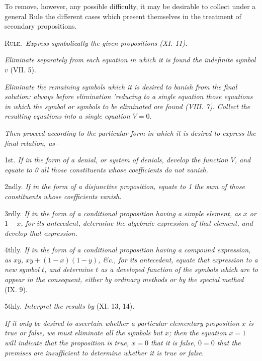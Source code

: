 \documentclass[oneside]{book}
\begin{document}
To remove, however, any possible difficulty, it may be desirable
to collect under a general Rule the different cases which
present themselves in the treatment of secondary propositions.

\textsc{Rule}.--\textit{Express symbolically the given propositions (XI. 11).}

\textit{Eliminate separately from each equation in which it is found the
indefinite symbol} $v$ (VII. 5).

\textit{Eliminate the remaining symbols which it is desired to banish
from the final solution: always before elimination 'reducing to a
single equation those equations in which the symbol or symbols to
be eliminated are found (VIII. 7). Collect the resulting equations
into a single equation $V = 0$}.

\textit{Then proceed according to the particular form in which it is
desired to express the final relation, as--}

1st. \textit{If in the form of a denial, or system of denials, develop the
function $V$, and equate to 0 all those constituents whose coefficients
do not vanish.}

2ndly. \textit{If in the form of a disjunctive proposition, equate to 1
the sum of those constituents whose coefficients vanish.}

3rdly. \textit{If in the form of a conditional proposition having a simple
element, as $x$ or $1-x$, for its antecedent, determine the algebraic
expression of that element, and develop that expression.}

4thly. \textit{If in the form of a conditional proposition having a
compound expression, as $xy$, $xy+(1-x)(1-y)$, \&c., for its antecedent,
equate that expression to a new symbol $t$, and determine $t$
as a developed function of the symbols which are to appear in the
consequent, either by ordinary methods or by the special method}
(IX. 9).

5thly. \textit{Interpret the results by} (XI. 13, 14).

\textit{If it only be desired to ascertain whether a particular elementary
proposition $x$ is true or false, we must eliminate all the symbols
but $x$; then the equation $x = 1$ will indicate that the proposition
is true, $x = 0$ that it is false, $0 = 0$ that the premises are insufficient
to determine whether it is true or false.}
\end{document}
